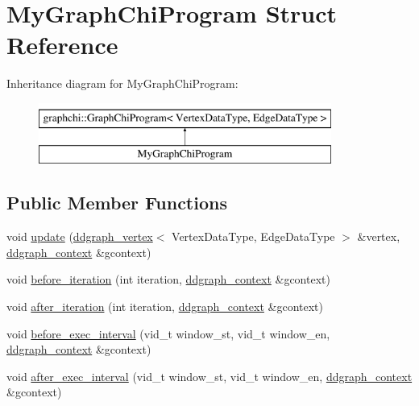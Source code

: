 \hypertarget{struct_my_graph_chi_program}{\section{My\-Graph\-Chi\-Program Struct Reference}
\label{struct_my_graph_chi_program}
}
Inheritance diagram for My\-Graph\-Chi\-Program\-:\begin{figure}[H]
\begin{center}
\leavevmode
\includegraphics[height=2.000000cm]{struct_my_graph_chi_program}
\end{center}
\end{figure}
\subsection*{Public Member Functions}
\begin{DoxyCompactItemize}
\item 
void \hyperlink{struct_my_graph_chi_program_abdfcf1ebfeaa35790060e9f79dff4209}{update} (\hyperlink{classddgraph_1_1ddgraph__vertex}{ddgraph\-\_\-vertex}$<$ Vertex\-Data\-Type, Edge\-Data\-Type $>$ \&vertex, \hyperlink{structddgraph_1_1ddgraph__context}{ddgraph\-\_\-context} \&gcontext)
\item 
void \hyperlink{struct_my_graph_chi_program_a2d16696c74cea6bdbb4f237595563b8a}{before\-\_\-iteration} (int iteration, \hyperlink{structddgraph_1_1ddgraph__context}{ddgraph\-\_\-context} \&gcontext)
\item 
void \hyperlink{struct_my_graph_chi_program_a6e9c87461584131b1b7546a258a9e1ab}{after\-\_\-iteration} (int iteration, \hyperlink{structddgraph_1_1ddgraph__context}{ddgraph\-\_\-context} \&gcontext)
\item 
void \hyperlink{struct_my_graph_chi_program_a77c27ea8780ebffa75618cd6a875f353}{before\-\_\-exec\-\_\-interval} (vid\-\_\-t window\-\_\-st, vid\-\_\-t window\-\_\-en, \hyperlink{structddgraph_1_1ddgraph__context}{ddgraph\-\_\-context} \&gcontext)
\item 
void \hyperlink{struct_my_graph_chi_program_a3d208961e548f3c29cc3edc26c74e3ac}{after\-\_\-exec\-\_\-interval} (vid\-\_\-t window\-\_\-st, vid\-\_\-t window\-\_\-en, \hyperlink{structddgraph_1_1ddgraph__context}{ddgraph\-\_\-context} \&gcontext)
\end{DoxyCompactItemize}

